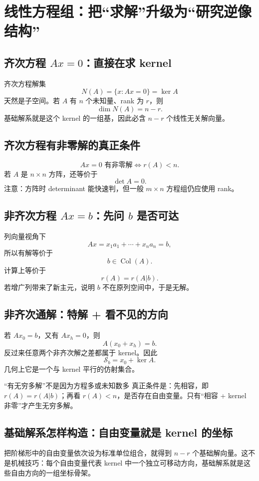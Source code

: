 \documentclass[11pt,a4paper,openany]{ctexbook}
\begin{document}
\chapter{线性方程组：把“求解”升级为“研究逆像结构”}

\section{齐次方程 \texorpdfstring{$Ax=0$}{Ax=0}：直接在求 kernel}
齐次方程解集
\[
N(A)=\{x:Ax=0\}=\ker A
\]
天然是子空间。若 $A$ 有 $n$ 个未知量、rank 为 $r$，则
\[
\dim N(A)=n-r.
\]
基础解系就是这个 kernel 的一组基，因此必含 $n-r$ 个线性无关解向量。

\section{齐次方程有非零解的真正条件}
\[
Ax=0\text{ 有非零解}\iff r(A)<n.
\]
若 $A$ 是 $n\times n$ 方阵，还等价于
\[
\det A=0.
\]
注意：方阵时 determinant 能快速判，但一般 $m\times n$ 方程组仍应使用 rank。

\section{非齐次方程 \texorpdfstring{$Ax=b$}{Ax=b}：先问 \texorpdfstring{$b$}{b} 是否可达}
列向量视角下
\[
Ax=x_1a_1+\cdots+x_na_n=b,
\]
所以有解等价于
\[
b\in\operatorname{Col}(A).
\]
计算上等价于
\[
\boxed{r(A)=r(A|b)}.
\]
若增广列带来了新主元，说明 $b$ 不在原列空间中，于是无解。

\section{非齐次通解：特解 + 看不见的方向}
若 $Ax_0=b$，又有 $Ax_h=0$，则
\[
A(x_0+x_h)=b.
\]
反过来任意两个非齐次解之差都属于 kernel。因此
\[
\boxed{\mathcal S_b=x_0+\ker A}.
\]
几何上它是一个与 kernel 平行的仿射集合。

\begin{boundarybox}{“有无穷多解”不是因为方程多或未知数多}
真正条件是：先相容，即 $r(A)=r(A|b)$；再看 $r(A)<n$，是否存在自由变量。只有“相容 + kernel 非零”才产生无穷多解。
\end{boundarybox}

\section{基础解系怎样构造：自由变量就是 kernel 的坐标}
把阶梯形中的自由变量依次设为标准单位组合，就得到 $n-r$ 个基础解向量。这不是机械技巧：每个自由变量代表 kernel 中一个独立可移动方向，基础解系就是这些自由方向的一组坐标骨架。
\end{document}
